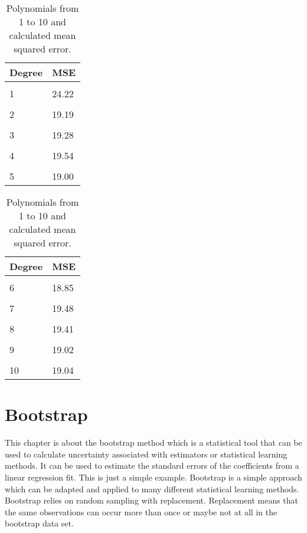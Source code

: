 \begin{table}[htbp]
	\centering
	\begin{subtable}[t]{2in}
		\centering
		\begin{tabular}{ p{2.5cm} p{1.5cm}  }
			\textbf{Degree} & \textbf{MSE} \\
			\hline 
			\\
			1 & 24.22 \\\hline
			\\
			2 & 19.19 \\\hline
			\\
			3 & 19.28 \\\hline
			\\
			4 & 19.54  \\\hline
			\\
			5 & 19.00  \\\hline
		\end{tabular}
		\label{table:mse_validation}
	\end{subtable}
	\quad 
	\begin{subtable}[t]{2in}
		\centering
		\begin{tabular}{ p{2.5cm} p{1.5cm}  }
			\textbf{Degree} & \textbf{MSE} \\
			\hline 
			\\
			6 & 18.85 \\\hline
			\\
			7 & 19.48  \\\hline
			\\
			8 & 19.41  \\\hline
			\\
			9 & 19.02  \\\hline
			\\
			10 & 19.04  \\\hline
		\end{tabular}
		\label{table:mse_cross}
	\end{subtable}
	\caption{Polynomials from 1 to 10 and calculated mean squared error.}\label{table:kfold_polynomials_mse}
\end{table}


\section{Bootstrap}
This chapter is about the bootstrap method which is a statistical tool that can be used to calculate uncertainty associated with estimators or statistical learning methods. It can be used to estimate the standard errors of the coefficients from a linear regression fit. This is just a simple example. Bootstrap is a simple approach which can be adapted and applied to many different statistical learning methods. Bootstrap relies on random sampling with replacement. Replacement means that the same observations can occur more than once or maybe not at all in the bootstrap data set. 

